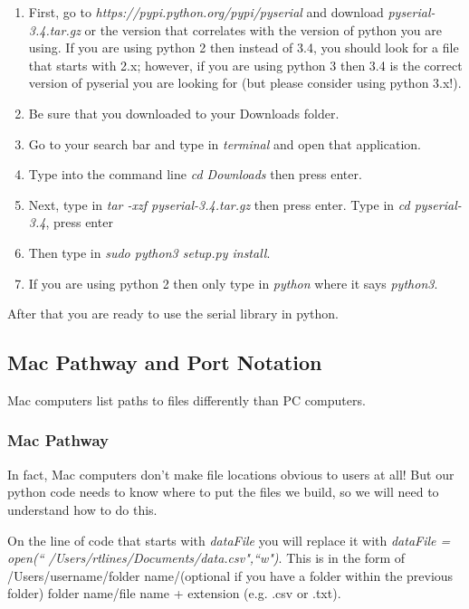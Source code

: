 \begin{enumerate}
\item First, go to \textit{https://pypi.python.org/pypi/pyserial} and
download \textit{pyserial-3.4.tar.gz} or the version that correlates with
the version of python you are using. If you are using python 2 then instead
of 3.4, you should look for a file that starts with 2.x; however, if you are
using python 3 then 3.4 is the correct version of pyserial you are looking
for (but please consider using python 3.x!).

\item Be sure that you downloaded to your Downloads folder.

\item Go to your search bar and type in \textit{terminal} and open that
application.

\item Type into the command line \textit{cd Downloads} then press enter.

\item Next, type in \textit{tar -xzf pyserial-3.4.tar.gz} then press enter.
Type in \textit{cd pyserial-3.4}, press enter

\item Then type in \textit{sudo python3 setup.py install}.

\item If you are using python 2 then only type in \textit{python} where it
says \textit{python3}.
\end{enumerate}

After that you are ready to use the serial library in python.

\subsection{Mac Pathway and Port Notation}

Mac computers list paths to files differently than PC computers.

\subsubsection{Mac Pathway}

In fact, Mac computers don't make file locations obvious to users at all!
But our python code needs to know where to put the files we build, so we
will need to understand how to do this.

On the line of code that starts with \textit{dataFile} you will replace it
with \textit{dataFile = open(\textquotedblleft
/Users/rtlines/Documents/data.csv",\textquotedblleft w")}. This is in the
form of /Users/username/folder name/(optional if you have a folder within
the previous folder) folder name/file name + extension (e.g. .csv or .txt).

